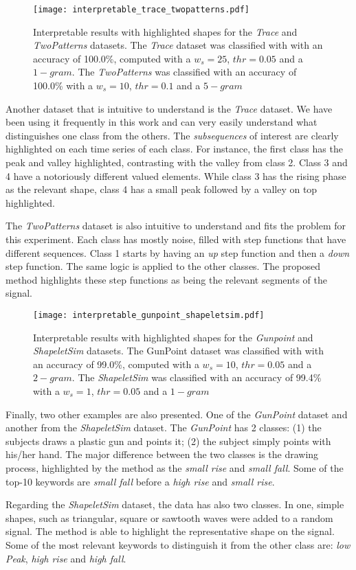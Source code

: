 \begin{figure}[h]
    \centering
    \texttt{[image: interpretable\_trace\_twopatterns.pdf]}
    \caption{Interpretable results with highlighted shapes for the \textit{Trace} and \textit{TwoPatterns} datasets. The \textit{Trace} dataset was classified with with an accuracy of 100.0\%, computed with a $w_s=25$, $thr=0.05$ and a $1-gram$. The \textit{TwoPatterns} was classified with an accuracy of 100.0\% with a $w_s=10$, $thr=0.1$ and a $5-gram$}
    \label{fig:interpretable2}
\end{figure}

Another dataset that is intuitive to understand is the \textit{Trace} dataset. We have been using it frequently in this work and can very easily understand what distinguishes one class from the others. The \textit{subsequences} of interest are clearly highlighted on each time series of each class. For instance, the first class has the peak and valley highlighted, contrasting with the valley from class 2. Class 3 and 4 have a notoriously different valued elements. While class 3 has the rising phase as the relevant shape, class 4 has a small peak followed by a valley on top highlighted.
\par
The \textit{TwoPatterns} dataset is also intuitive to understand and fits the problem for this experiment. Each class has mostly noise, filled with step functions that have different sequences. Class 1 starts by having an \textit{up} step function and then a \textit{down} step function. The same logic is applied to the other classes. The proposed method highlights these step functions as being the relevant segments of the signal.

\begin{figure}[h]
    \centering
    \texttt{[image: interpretable\_gunpoint\_shapeletsim.pdf]}
    \caption{Interpretable results with highlighted shapes for the \textit{Gunpoint} and \textit{ShapeletSim} datasets. The GunPoint dataset was classified with with an accuracy of 99.0\%, computed with a $w_s=10$, $thr=0.05$ and a $2-gram$. The \textit{ShapeletSim} was classified with an accuracy of 99.4\% with a $w_s=1$, $thr=0.05$ and a $1-gram$}
    \label{fig:interpretable3}
\end{figure}

Finally, two other examples are also presented. One of the \textit{GunPoint} dataset and another from the \textit{ShapeletSim} dataset. The \textit{GunPoint} has 2 classes: (1) the subjects draws a plastic gun and points it; (2) the subject simply points with his/her hand. The major difference between the two classes is the drawing process, highlighted by the method as the \textit{small rise} and \textit{small fall}. Some of the top-10 keywords are \textit{small fall} before a \textit{high rise} and \textit{small rise}.
\par
Regarding the \textit{ShapeletSim} dataset, the data has also two classes. In one, simple shapes, such as triangular, square or sawtooth waves were added to a random signal. The method is able to highlight the representative shape on the signal. Some of the most relevant keywords to distinguish it from the other class are: \textit{low Peak}, \textit{high rise} and \textit{high fall}. 

